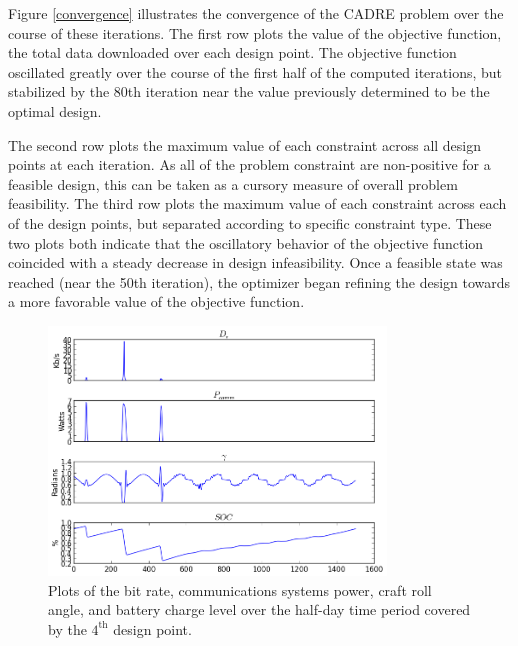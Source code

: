 \documentclass[]{aiaa-tc} %
\begin{document}
    Figure \ref{convergence} illustrates the convergence of the CADRE problem over the course of
    these iterations. The first row plots the
    value of the objective function, the total data downloaded over each design point. The objective
    function oscillated greatly over the course of the first half of the computed iterations, but
    stabilized by the 80th iteration near the value previously determined \cite{CADRE2012}
    to be the optimal design.

    The second row plots the maximum value of each constraint across all design points at
    each iteration. As all of the problem constraint are non-positive for a feasible design,
    this can be taken as a cursory measure of overall problem feasibility.
    The third row plots the maximum value of each constraint across each of the design points,
    but separated according to specific constraint type. These two plots both indicate that the
    oscillatory behavior of the objective function coincided with a steady decrease in design
    infeasibility. Once a feasible state was reached (near the 50th iteration), the optimizer
    began refining the design towards a more favorable value of the objective function.

    \begin{figure}
    \centering
    \includegraphics[width=0.8\textwidth]{images/pt_3_data.png}
    \caption[width=0.4\textwidth]{Plots of the bit rate, communications systems power, craft roll angle,
    and battery charge level over the half-day time period covered by the $4^{\textrm{th}}$ design point.}
    \label{pt3_data_results}
    \end{figure}
\end{document}
